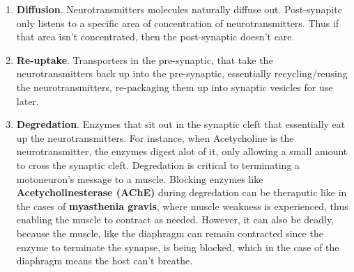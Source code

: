 \documentclass[12pt, a4paper]{article}
\begin{document}
\begin{enumerate}
    \item \textbf{Diffusion}. Neurotransmitters molecules naturally diffuse out. Post-synapitc only listens to a specific area of 
    concentration of neurotransmitters. Thus if that area isn't concentrated, then the post-synaptic doesn't care.
    \item \textbf{Re-uptake}. Transporters in the pre-synaptic, that take the neurotransmitters back up into the pre-synaptic,
    essentially recycling/reusing the neurotransmitters, re-packaging them up into synaptic vesicles for use later.
    \item \textbf{Degredation}. Enzymes that sit out in the synaptic cleft that essentially eat up the neurotransmitters.
    For instance, when Acetycholine is the neurotransmitter, the enzymes digest alot of it, only allowing a small amount to 
    cross the synaptic cleft. Degredation is critical to terminating a motoneuron's message to a muscle. Blocking enzymes like
    \textbf{Acetycholinesterase (AChE)} during degredation can be theraputic like in the cases of \textbf{myasthenia gravis},
    where muscle weakness is experienced, thus enabling the muscle to contract as needed. However, it 
    can also be deadly, because the muscle, like the diaphragm can remain contracted since the enzyme to terminate the synapse,
    is being blocked, which in the case of the diaphragm means the host can't breathe.
\end{enumerate}
\end{document}
